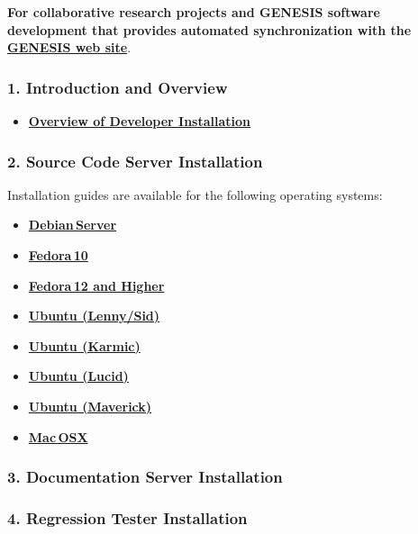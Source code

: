 \documentclass[12pt]{article}
\begin{document}
{\bf For collaborative research projects and GENESIS software development that provides automated synchronization with the \href{http://www.genesis-sim.org/}{\bf GENESIS web site}}.

\subsubsection*{1. Introduction and Overview}

\begin{itemize}
   \item[]\href{../developer-installation/developer-installation.tex}{\bf Overview of Developer Installation}
\end{itemize}

\subsubsection*{2. Source Code Server Installation}

Installation guides are available for the following operating systems:
\begin{itemize}
   \item[]\href{../installation-debian-server/installation-debian-server.tex}{\bf Debian\,Server}
   \item[]\href{../installation-fedora10/installation-fedora10.tex}{\bf Fedora\,10}
   \item[]\href{../installation-fedora12/installation-fedora12.tex}{\bf Fedora\,12 and Higher}
   \item[]\href{../installation-ubuntu-lennysid/installation-ubuntu-lennysid.tex}{\bf Ubuntu (Lenny/Sid)}
   \item[]\href{../installation-ubuntu-karmic/installation-ubuntu-karmic.tex}{\bf Ubuntu (Karmic)}
   \item[]\href{../installation-ubuntu-lucid/installation-ubuntu-lucid.tex}{\bf Ubuntu (Lucid)}
   \item[]\href{../installation-ubuntu-maverick/installation-ubuntu-maverick.tex}{\bf Ubuntu (Maverick)}
   \item[]\href{../installation-osx/installation-osx.tex}{\bf Mac\,OSX}
\end{itemize}

\subsubsection*{3. Documentation Server Installation}

\subsubsection*{4. Regression Tester Installation}
\end{document}
